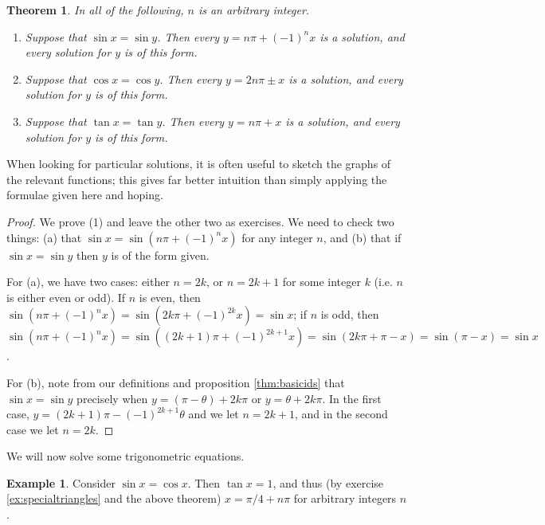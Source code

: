 \documentclass[a4paper,leqno]{article}
\numberwithin{equation}{section}
\newtheorem{thm}[equation]{Theorem}
\theoremstyle{definition}
\newtheorem{ex}[equation]{Example}
\theoremstyle{remark}
\begin{document}
\begin{thm}\leavevmode
  In all of the following, $n $ is an arbitrary integer.
  \begin{enumerate}
    \item Suppose that $ \sin x = \sin y $. Then every $ y = n\pi + (-1)^n x $ is a solution, and every solution for $ y $ is of this form.
    \item Suppose that $ \cos x = \cos y $. Then every $ y = 2n\pi \pm x $ is a solution, and every solution for $ y $ is of this form.
    \item Suppose that $ \tan x = \tan y $. Then every $ y = n\pi + x $ is a solution, and every solution for $ y $ is of this form.
  \end{enumerate}
\end{thm}
When looking for particular solutions, it is often useful to sketch the graphs of the relevant functions; this gives far better intuition
than simply applying the formulae given here and hoping.
\begin{proof}
  We prove (1) and leave the other two as exercises. We need to check two things: (a) that $ \sin x = \sin (n\pi + (-1)^n x) $ for any integer $ n $,
  and (b) that if $ \sin x = \sin y $ then $ y $ is of the form given.

  For (a), we have two cases: either $ n = 2k $, or $ n = 2k + 1 $ for some integer $ k $ (i.e. $ n $ is either even or odd). If $ n $ is
  even, then $ \sin(n\pi + (-1)^n x) = \sin(2k\pi + (-1)^{2k} x) = \sin x $; if $ n $ is odd,
  then $ \sin(n\pi + (-1)^n x) = \sin((2k + 1)\pi + (-1)^{2k + 1}x) = \sin(2k\pi + \pi - x) = \sin(\pi - x) = \sin x $.

  For (b), note from our definitions and proposition \ref{thm:basicids} that $ \sin x = \sin y $ precisely when $ y = (\pi - \theta) + 2k\pi $
  or $ y = \theta + 2k\pi $. In the first case, $ y = (2k + 1)\pi - (-1)^{2k + 1} \theta $ and we let $ n = 2k + 1 $, and in the second case
  we let $ n = 2k $.
\end{proof}

We will now solve some trigonometric equations.
\begin{ex}
  Consider $ \sin x = \cos x $. Then $ \tan x = 1 $, and thus (by exercise \ref{ex:specialtriangles} and the above theorem) $ x = \pi/4 + n\pi $
  for arbitrary integers $ n $.
\end{ex}
\end{document}
